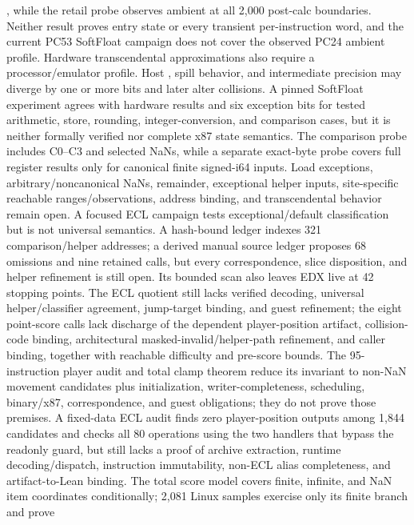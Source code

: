 \begin{itemize}
  , while the retail probe observes ambient  at all
  2,000 post-calc boundaries.  Neither result proves entry state or every
  transient per-instruction word, and the current PC53 SoftFloat campaign does
  not cover the observed PC24 ambient profile.  Hardware
  transcendental approximations also require a processor/emulator profile.
  Host , spill behavior, and intermediate precision may diverge by
  one or more bits and later alter collisions.  A pinned SoftFloat experiment
  agrees with hardware results and six exception bits for tested arithmetic,
  store, rounding, integer-conversion, and comparison cases, but it is neither
  formally verified nor complete x87 state semantics.  The comparison probe
  includes C0--C3 and selected NaNs, while a separate exact-byte
   probe covers full register results only for canonical finite
  signed-i64 inputs.  Load exceptions, arbitrary/noncanonical NaNs, remainder,
  exceptional helper inputs, site-specific reachable ranges/observations,
  address binding, and transcendental behavior remain open.  A focused ECL
  campaign tests exceptional/default classification but is not universal
  semantics.  A hash-bound ledger indexes 321 comparison/helper addresses; a
  derived manual
  source ledger proposes 68 omissions and nine retained calls, but every
  correspondence, slice disposition, and helper refinement is still open.  Its
  bounded scan also leaves EDX live at 42 stopping points.  The ECL quotient
  still lacks verified decoding, universal helper/classifier agreement,
  jump-target binding, and guest refinement; the eight point-score calls lack
  discharge of the dependent player-position artifact, collision-code binding,
  architectural masked-invalid/helper-path refinement, and caller binding,
  together with reachable difficulty and pre-score bounds.  The 95-instruction
  player audit and total clamp theorem reduce its invariant to non-NaN movement
  candidates plus initialization, writer-completeness, scheduling, binary/x87,
  correspondence, and guest obligations; they do not prove those premises.  A
  fixed-data ECL audit finds zero player-position outputs among 1,844 candidates
  and checks all 80 operations using the two handlers that bypass the readonly
  guard, but still lacks a
  proof of archive extraction, runtime decoding/dispatch, instruction
  immutability, non-ECL alias completeness, and artifact-to-Lean binding.
  The total score model covers finite, infinite, and NaN item coordinates
  conditionally; 2,081 Linux samples exercise only its finite branch and prove

\end{itemize}
